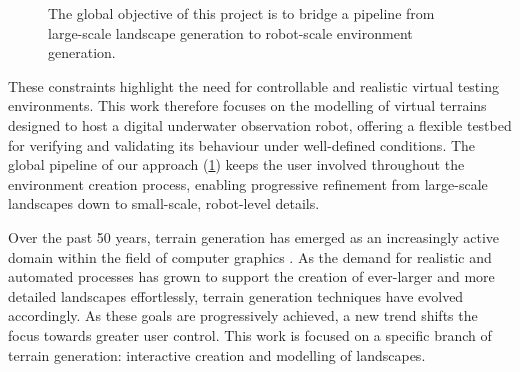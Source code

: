 \begin{figure}
    \caption[Global pipeline of the thesis]{The global objective of this project is to bridge a pipeline from large-scale landscape generation to robot-scale environment generation. }
    \label{fig:intro-user-to-simu-pipeline}
\end{figure}


These constraints highlight the need for controllable and realistic virtual testing environments. This work therefore focuses on the modelling of virtual terrains designed to host a digital underwater observation robot, offering a flexible testbed for verifying and validating its behaviour under well-defined conditions. The global pipeline of our approach (\cref{fig:intro-user-to-simu-pipeline}) keeps the user involved throughout the environment creation process, enabling progressive refinement from large-scale landscapes down to small-scale, robot-level details.


Over the past 50 years, terrain generation has emerged as an increasingly active domain within the field of computer graphics \cite{Fournier1982,Musgrave1989,Miller1986,Galin2019}. As the demand for realistic and automated processes has grown to support the creation of ever-larger and more detailed landscapes effortlessly, terrain generation techniques have evolved accordingly. As these goals are progressively achieved, a new trend shifts the focus towards greater user control. This work is focused on a specific branch of terrain generation: interactive creation and modelling of landscapes.

